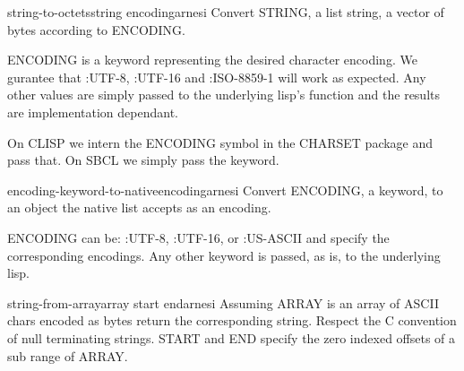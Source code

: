 \begin{function}{string-to-octets}{string encoding}{arnesi}{}
  Convert STRING, a list string, a vector of bytes according to ENCODING.

ENCODING is a keyword representing the desired character
encoding. We gurantee that :UTF-8, :UTF-16 and :ISO-8859-1 will
work as expected. Any other values are simply passed to the
underlying lisp's function and the results are implementation
dependant.

On CLISP we intern the ENCODING symbol in the CHARSET package and
pass that. On SBCL we simply pass the keyword.
\end{function}

\begin{function}{encoding-keyword-to-native}{encoding}{arnesi}{}
  Convert ENCODING, a keyword, to an object the native list
accepts as an encoding.

ENCODING can be: :UTF-8, :UTF-16, or :US-ASCII and specify the
corresponding encodings. Any other keyword is passed, as is, to
the underlying lisp.
\end{function}

\begin{function}{string-from-array}{array \key start end}{arnesi}{}
  Assuming ARRAY is an array of ASCII chars encoded as bytes return
the corresponding string. Respect the C convention of null terminating
strings. START and END specify the zero indexed offsets of a sub range
of ARRAY.
\end{function}

